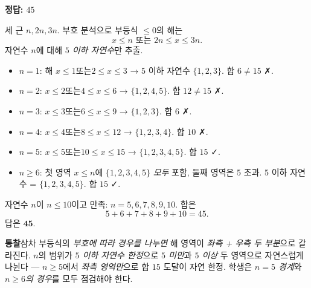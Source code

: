 \documentclass[10pt]{article}
\newcommand{\solnote}[1]{\par\smallskip\noindent
  \begin{tcolorbox}[enhanced, breakable, colback=vB-light, colframe=vB-light,
    boxrule=0pt, arc=3pt, left=10pt, right=10pt, top=4pt, bottom=4pt,
    fontupper=\sffamily\footnotesize\color{vB-ink}]
    \textbf{\color{vB-deep}통찰}\quad #1
  \end{tcolorbox}}
\begin{document}

\begin{answerbox}\sffamily\bfseries 정답: $45$\end{answerbox}
 세 근 $n, 2n, 3n$. 부호 분석으로 부등식 $\le 0$의 해는
\[ x \le n \text{ 또는 } 2n \le x \le 3n. \]
 자연수 $n$에 대해 \emph{$5$ 이하 자연수}만 추출.
\begin{itemize}\setlength{\itemsep}{0pt}
\item $n = 1$: 해 $x \le 1 또는2 \le x \le 3$ → $5$ 이하 자연수 $\{1, 2, 3\}$. 합 $6 \ne 15$ ✗.
\item $n = 2$: $x \le 2 또는4 \le x \le 6$ → $\{1, 2, 4, 5\}$. 합 $12 \ne 15$ ✗.
\item $n = 3$: $x \le 3 또는6 \le x \le 9$ → $\{1, 2, 3\}$. 합 $6$ ✗.
\item $n = 4$: $x \le 4 또는8 \le x \le 12$ → $\{1, 2, 3, 4\}$. 합 $10$ ✗.
\item $n = 5$: $x \le 5 또는10 \le x \le 15$ → $\{1, 2, 3, 4, 5\}$. 합 $15$ ✓.
\item $n \ge 6$: 첫 영역 $x \le n$에 $\{1, 2, 3, 4, 5\}$ \emph{모두} 포함, 둘째 영역은 $5$ 초과. $5$ 이하 자연수 = $\{1, 2, 3, 4, 5\}$. 합 $15$ ✓.
\end{itemize}
 자연수 $n$이 $n \le 10$이고 만족: $n = 5, 6, 7, 8, 9, 10$. 합은
\[ 5 + 6 + 7 + 8 + 9 + 10 = 45. \]
답은 $\textbf{45}$.
\solnote{삼차 부등식의 \emph{부호에 따라 경우를 나누면} 해 영역이 \emph{좌측 + 우측 두 부분}으로 갈라진다. $n$의 범위가 \emph{$5$ 이하 자연수 한정}으로 \emph{$5$ 미만}과 \emph{$5$ 이상} 두 영역으로 자연스럽게 나뉜다 — $n \ge 5$에서 \emph{좌측 영역만}으로 합 $15$ 도달이 자연 한정. 학생은 \emph{$n = 5$ 경계}와 \emph{$n \ge 6$의 경우}를 모두 점검해야 한다.}
\end{document}
